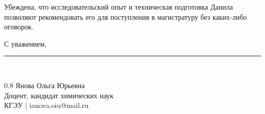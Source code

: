 \documentclass[a4paper,12pt]{article}
\begin{document}
Убеждена, что исследовательский опыт и техническая подготовка Данила позволяют рекомендовать его для поступления в магистратуру без каких-либо оговорок.

\vspace{10pt}
\noindent С уважением,

\vspace{15pt}
\rule{5cm}{0.4pt}\\[4pt]
\begin{spacing}{0.8}
  {Янова Ольга Юрьевна}\\
  {\small Доцент, кандидат химических наук}\\
  {\small КГЭУ | ianova.oiu@mail.ru}
\end{spacing}
\end{document}
